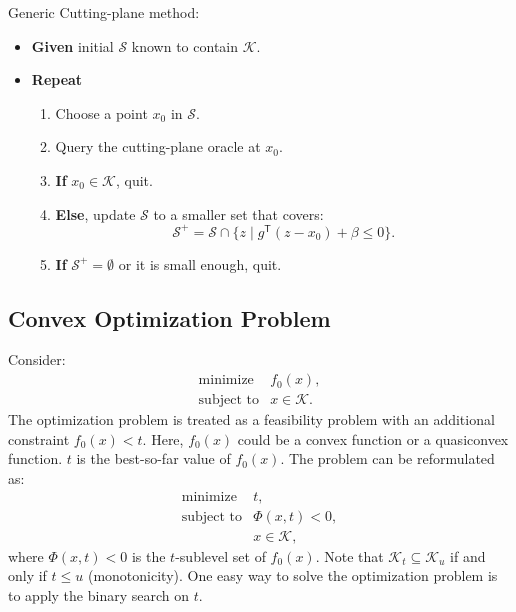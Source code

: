 \documentclass[final,leqno]{siamltex}
\providecommand{\tightlist}{%
  \setlength{\itemsep}{0pt}\setlength{\parskip}{0pt}}
\begin{document}
Generic Cutting-plane method:

\begin{itemize}
\tightlist
\item
  \textbf{Given} initial \(\mathcal{S}\) known to contain \(\mathcal{K}\).
\item
  \textbf{Repeat}

  \begin{enumerate}
  \def\labelenumi{\arabic{enumi}.}
  \tightlist
  \item
    Choose a point \(x_0\) in \(\mathcal{S}\).
  \item
    Query the cutting-plane oracle at \(x_0\).
  \item
    \textbf{If} \(x_0 \in \mathcal{K}\), quit.
  \item
    \textbf{Else}, update \(\mathcal{S}\) to a smaller set that covers:
    \[\mathcal{S}^+ = \mathcal{S} \cap \{z \mid g^\mathsf{T} (z - x_0) + \beta \leq 0\}.\]
  \item
    \textbf{If} \(\mathcal{S}^+ = \emptyset\) or it is small enough, quit.
  \end{enumerate}
\end{itemize}

\hypertarget{sec:convex-optimization-problem}{%
\subsection{Convex Optimization Problem}\label{sec:convex-optimization-problem}}

Consider:
\begin{equation}\begin{array}{ll}
    \text{minimize}     & f_0(x), \\
    \text{subject to}   & x \in \mathcal{K}.
  \end{array}
\label{eq:convex-optimization}\end{equation}
The optimization problem is treated as a feasibility problem with an additional constraint \(f_0(x) < t\). Here, \(f_0(x)\) could be a convex function or a quasiconvex function. \(t\) is the best-so-far value of \(f_0(x)\). The problem can be reformulated as:
\begin{equation}\begin{array}{ll}
    \text{minimize}   & t, \\
    \text{subject to} & \Phi(x, t) < 0, \\
                      & x \in \mathcal{K},
  \end{array}
\label{eq:cvx-in-feasibility-form}\end{equation}
where \(\Phi(x, t) < 0\) is the \(t\)-sublevel set of \(f_0(x)\). Note that \(\mathcal{K}_t \subseteq \mathcal{K}_u\) if and only if \(t \leq u\) (monotonicity). One easy way to solve the optimization problem is to apply the binary search on \(t\).
\end{document}
